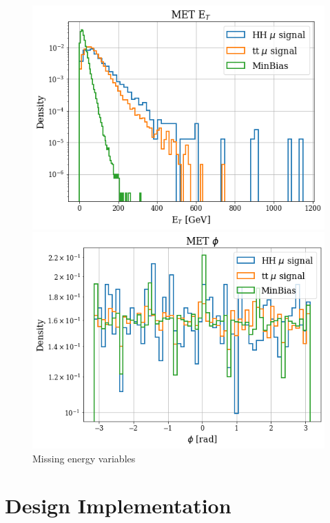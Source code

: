 \documentclass[../main.tex]{subfiles}
\begin{document}
\begin{figure}[h]
  \begin{minipage}[b]{0.5\linewidth}
    \centering
    \includegraphics[width=0.66\linewidth]{Chapters/Plots/Hist_1mu_met_Et.png}
  \end{minipage} %
  \begin{minipage}[b]{0.5\linewidth}
    \centering
    \includegraphics[width=0.66\linewidth]{Chapters/Plots/Hist_1mu_met_Phi.png}
  \end{minipage}
  \caption{Missing energy variables}
\end{figure}
\clearpage

    
\chapter{Design Implementation}
\label{sec:App_Desgin}
\end{document}
